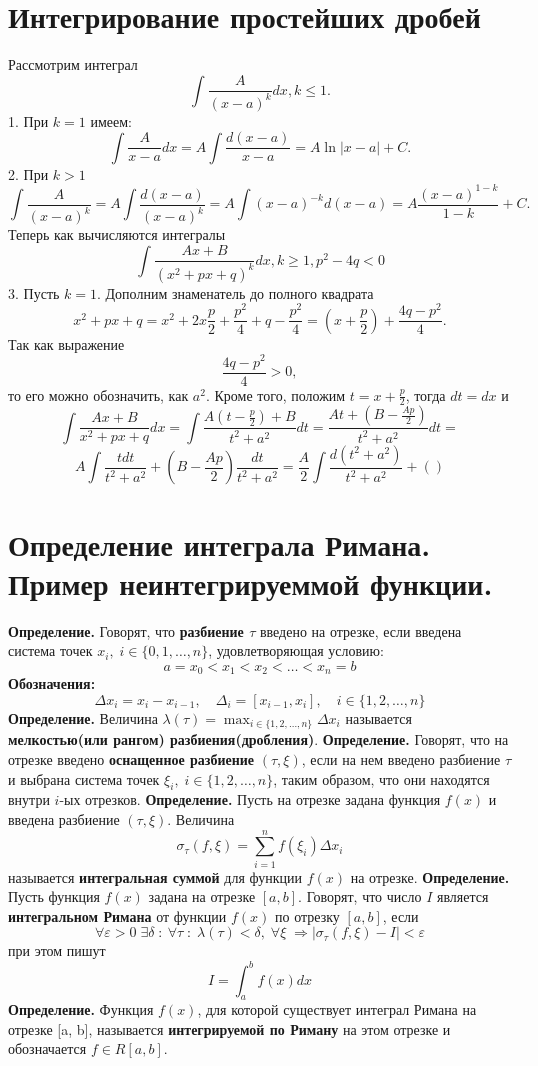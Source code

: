 \documentclass{article}
\newcommand*{\definition}[1]{\textbf{Определение.} #1 \newline}
\newcommand*{\sfrac}{\frac{A}{(x - a)^k}}
\begin{document}
\section{Интегрирование простейших дробей}
Рассмотрим интеграл 
$$
    \int \sfrac dx, k \leq 1.
$$
1. При $k = 1$ имеем:
$$
    \int \frac{A}{x - a}dx = A \int \frac{d(x - a)}{x - a} = A\ln|x - a| + C.
$$
2. При $k > 1$
$$  
    \int \frac{A}{(x - a)^k} = A \int \frac{d(x - a)}{(x - a)^k} = A \int (x - a)^{-k}d(x - a) = A\frac{(x - a)^{1 - k}}{1 - k} + C.
$$ 
Теперь как вычисляются интегралы
$$
    \int \frac{Ax + B}{(x^2 + px + q)^k}dx, k \geq 1, p^2 - 4q < 0
$$
3. Пусть $k = 1$. Дополним знаменатель до полного квадрата
$$
    x^2 + px + q = x^2 + 2x\frac{p}{2} + \frac{p^2}{4} + q - \frac{p^2}{4} = \left(x + \frac{p}{2}\right) + \frac{4q - p^2}{4}.
$$ 
Так как выражение
$$
    \frac{4q - p^2}{4} > 0,
$$
то его можно обозначить, как $a^2$. Кроме того, положим $t = x + \frac{p}{2}$, тогда $dt = dx$ и
$$
    \int \frac{Ax+B}{x^2 + px + q}dx = \int \frac{A(t - \frac{p}{2}) + B}{t^2 + a^2}dt = \frac{At + (B - \frac{Ap}{2})}{t^2 + a^2}dt =
$$
$$
    A \int \frac{tdt}{t^2 + a^2} + \left(B - \frac{Ap}{2}\right) \frac{dt}{t^2 + a^2} = \frac{A}{2} \int \frac{d(t^2 + a^2)}{t^2 + a^2} + \left(\right)
$$
\section{Определение интеграла Римана. Пример неинтегрируеммой функции.}
\definition{ Говорят, что \textbf{разбиение $\tau$} введено на отрезке, если введена система точек $x_i, \; i \in \{0, 1, \dots, n\}$, удовлетворяющая условию: }
$$
    a = x_0 < x_1 < x_2 < \dots < x_n = b
$$
\textbf{Обозначения: }
$$
    \Delta x_i = x_i - x_{i-1}, \quad \Delta_i = [x_{i-1}, x_i], \quad i \in \{1, 2, \dots, n \}
$$
\definition{Величина $\lambda(\tau) = \displaystyle \max_{i \in \{1, 2, \dots, n \}} \Delta x_i$ называется \textbf{мелкостью(или рангом) разбиения(дробления)}.}
\newline
\definition{Говорят, что на отрезке введено \textbf{оснащенное разбиение} $(\tau, \xi)$, если на нем введено разбиение $\tau$ и выбрана система точек $\xi_i, \; i \in \{ 1, 2, \dots, n\}$, таким образом, что они находятся внутри $i$-ых отрезков.}
\newline
\definition{Пусть на отрезке задана функция $f(x)$ и введена разбиение $(\tau, \xi)$. Величина}
$$
    \sigma_\tau(f, \xi) = \sum_{i = 1}^{n} f(\xi_i) \Delta x_i
$$
называется \textbf{интегральная суммой} для функции $f(x)$ на отрезке.
\newline 
\newline 
\definition{Пусть функция $f(x)$ задана на отрезке $[a, b]$. Говорят, что число $I$ является \textbf{интегральном Римана} от функции $f(x)$ по отрезку $[a, b]$, если}
$$
    \forall \varepsilon > 0 \; \exists \delta \; : \: \forall \tau \; : \; \lambda(\tau) < \delta, \; \forall \xi \; \Rightarrow |\sigma_\tau(f, \xi) - I| < \varepsilon
$$
при этом пишут 
$$
    I = \int_{a}^{b} f(x)dx
$$
\definition{Функция $f(x)$, для которой существует интеграл Римана на отрезке [a, b], называется \textbf{интегрируемой по Риману} на этом отрезке и обозначается $f \in R[a, b]$.}
\newline 
\end{document}
